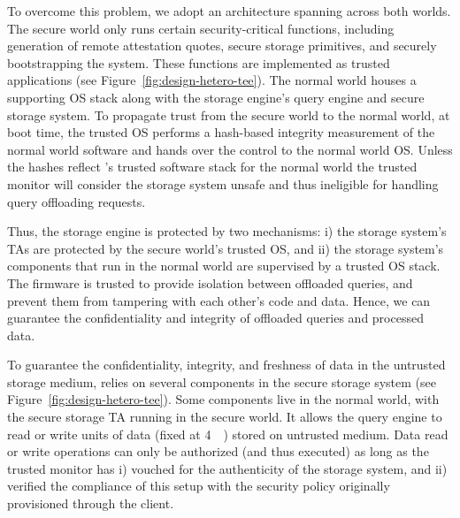 To overcome this problem, we adopt an architecture spanning across both worlds. The secure world only runs certain security-critical functions, including generation of remote attestation quotes, secure storage primitives, and securely bootstrapping the system. These functions are implemented as trusted applications (see Figure~\ref{fig:design-hetero-tee}). The normal world houses a supporting OS stack along with the storage engine's query engine and secure storage system. To propagate trust from the secure world to the normal world, at boot time, the trusted OS performs a hash-based integrity measurement of the normal world software and hands over the control to the normal world OS. Unless the hashes reflect \project's trusted software stack for the normal world the trusted monitor will consider the storage system unsafe and thus ineligible for handling query offloading requests.

Thus, the storage engine is protected by two mechanisms: i) the storage system's TAs are protected by the secure world's trusted OS, and ii) the storage system's components that run in the normal world are supervised by a trusted OS stack. The firmware is trusted to provide isolation between offloaded queries, and prevent them from tampering with each other's code and data. Hence, we can guarantee the confidentiality and integrity of offloaded queries and processed data.

 To guarantee the confidentiality, integrity, and freshness of data in the untrusted storage medium, \project{} relies on several components in the secure storage system (see 
Figure~\ref{fig:design-hetero-tee}). Some components live in the normal world, with the secure storage TA running in the secure world. It allows the query engine to read or write units of data (fixed at \SI{4}{\kibi\byte}) stored on untrusted medium. Data read or write operations can only be authorized (and thus executed) as long as the trusted monitor has i) vouched for the authenticity of the storage system, and ii) verified the compliance of this setup with the security policy originally provisioned through the client.

